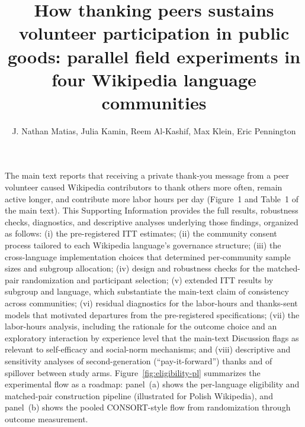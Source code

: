 \documentclass[9pt,twoside,lineno]{pnas-new}
\title{How thanking peers sustains volunteer participation in public goods: parallel field experiments in four Wikipedia language communities}
\author{J. Nathan Matias, Julia Kamin, Reem Al-Kashif, Max Klein, Eric Pennington}
\begin{document}

\fancyhead{}%
\maketitle




\SItext
The main text reports that receiving a private thank-you message from a peer volunteer caused Wikipedia contributors to thank others more often, remain active longer, and contribute more labor hours per day (Figure~1 and Table~1 of the main text). This Supporting Information provides the full results, robustness checks, diagnostics, and descriptive analyses underlying those findings, organized as follows: (i) the pre-registered ITT estimates; (ii) the community consent process tailored to each Wikipedia language's governance structure; (iii) the cross-language implementation choices that determined per-community sample sizes and subgroup allocation; (iv) design and robustness checks for the matched-pair randomization and participant selection; (v) extended ITT results by subgroup and language, which substantiate the main-text claim of consistency across communities; (vi) residual diagnostics for the labor-hours and thanks-sent models that motivated departures from the pre-registered specifications; (vii) the labor-hours analysis, including the rationale for the outcome choice and an exploratory interaction by experience level that the main-text Discussion flags as relevant to self-efficacy and social-norm mechanisms; and (viii) descriptive and sensitivity analyses of second-generation (``pay-it-forward'') thanks and of spillover between study arms. Figure~\ref{fig:eligibility-pl} summarizes the experimental flow as a roadmap: panel~(a) shows the per-language eligibility and matched-pair construction pipeline (illustrated for Polish Wikipedia), and panel~(b) shows the pooled CONSORT-style flow from randomization through outcome measurement.

\end{document}
